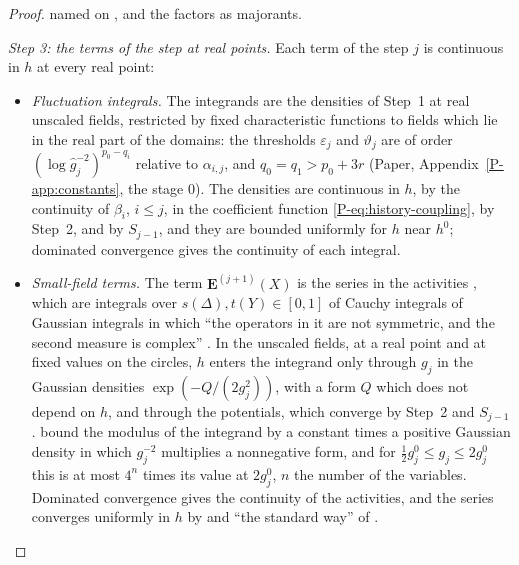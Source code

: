 \documentclass[11pt]{preprint}
\numberwithin{equation}{section}
\theoremstyle{definition}
\theoremstyle{remark}
\theoremstyle{plain}
\begin{document}
\begin{proof}
named on \cite[p.~372]{BalabanLFR2}, and the factors \cite[(1.66), p.~376]{BalabanLFR2} as majorants.

\emph{Step 3: the terms of the step at real points.} Each term of the step $j$ is continuous in $h$ at every real point:
\begin{itemize}
\item \emph{Fluctuation integrals.} The integrands are the densities of Step~1 at real unscaled fields, restricted by fixed characteristic functions to fields which lie in the real part of the domains: the thresholds $\varepsilon_j$ and $\vartheta_j$ are of order $(\log\hat g_j^{-2})^{p_0-q_i}$ relative to $\alpha_{i,j}$, and $q_0 = q_1 > p_0 + 3r$ (Paper, Appendix~\ref{P-app:constants}, the stage $0$). The densities are continuous in $h$, by the continuity of $\beta_i$, $i \leq j$, in the coefficient function \eqref{P-eq:history-coupling}, by Step~2, and by $S_{j-1}$, and they are bounded uniformly for $h$ near $h^0$; dominated convergence gives the continuity of each integral.
\item \emph{Small-field terms.} The term $\mathbf E^{(j+1)}(X)$ is the series \cite[(2.13), p.~14]{BalabanRG2} in the activities \cite[(2.14), p.~15]{BalabanRG2}, which are integrals over $s(\Delta), t(Y) \in [0, 1]$ of Cauchy integrals of Gaussian integrals in which ``the operators in it are not symmetric, and the second measure is complex'' \cite[p.~15]{BalabanRG2}. In the unscaled fields, at a real point and at fixed values on the circles, $h$ enters the integrand only through $g_j$ in the Gaussian densities $\exp(-Q/(2g_j^2))$, with a form $Q$ which does not depend on $h$, and through the potentials, which converge by Step~2 and $S_{j-1}$. \cite[(2.15)--(2.25), pp.~15--17]{BalabanRG2} bound the modulus of the integrand by a constant times a positive Gaussian density in which $g_j^{-2}$ multiplies a nonnegative form, and for $\frac12g^0_j \leq g_j \leq 2g^0_j$ this is at most $4^n$ times its value at $2g^0_j$, $n$ the number of the variables. Dominated convergence gives the continuity of the activities, and the series converges uniformly in $h$ by \cite[(2.38), p.~20]{BalabanRG2} and ``the standard way'' of \cite[p.~20]{BalabanRG2}.

\end{itemize}
\end{proof}
\end{document}
